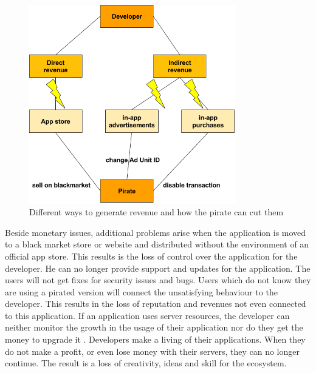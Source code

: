 \begin{figure}[h]
    \centering
    \includegraphics[width=0.8\textwidth]{data/revenue.png}
    \caption{Different ways to generate revenue and how the pirate can cut them}
    \label{fig:revenue}
\end{figure}
Beside monetary issues, additional problems arise when the application is moved to a black market store or website and distributed without the environment of an official app store.
This results is the loss of control over the application for the developer.
He can no longer provide support and updates for the application.
The users will not get fixes for security issues and bugs.
Users which do not know they are using a pirated version will connect the unsatisfying behaviour to the developer.
This results in the loss of reputation and revenues not even connected to this application.
\newline
If an application uses server resources, the developer can neither monitor the growth in the usage of their application nor do they get the money to upgrade it \cite{lierschDeveloperThreats}.
\newline
Developers make a living of their applications.
When they do not make a profit, or even lose money with their servers, they can no longer continue.
The result is a loss of creativity, ideas and skill for the ecosystem.
